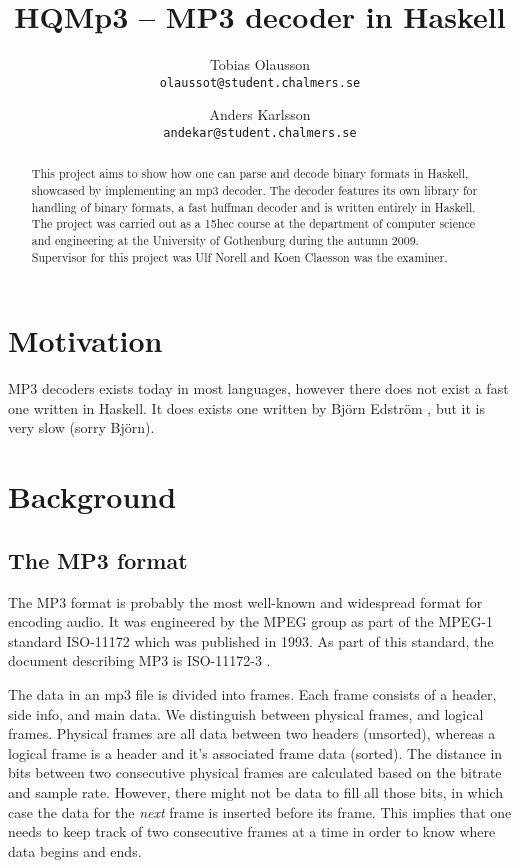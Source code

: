 \documentclass[a4paper,12pt]{article}
\title{HQMp3 -- MP3 decoder in Haskell}
\author{Tobias Olausson \\ \texttt{\small{olaussot@student.chalmers.se}} \and
        Anders Karlsson \\ \texttt{\small{andekar@student.chalmers.se}}
}
\date{ \rule{0.8 \linewidth}{0.5mm} \\[3mm]
       University of Gothenburg \\
       \small{\today}
}
\begin{document}
\maketitle

\begin{abstract}
    This project aims to show how one can parse and decode binary formats in
    Haskell, showcased by implementing an mp3 decoder. The decoder features its
    own library for handling of binary formats, a fast huffman decoder and is
    written entirely in Haskell. The project was carried out as a 15hec course
    at the department of computer science and engineering at the University of
    Gothenburg during the autumn 2009. \\

    Supervisor for this project was Ulf Norell and Koen Claesson was the
    examiner.
\end{abstract}

\newpage
\tableofcontents
\newpage

\section{Motivation}
    MP3 decoders exists today in most languages, however there does not exist
    a fast one written in Haskell. It does exists one written by Björn Edström
    \cite{bjorn}, but it is very slow (sorry
    Björn).

\section{Background}
    \subsection{The MP3 format}
       The MP3 format is probably the most well-known and widespread format for
       encoding audio. It was engineered by the MPEG group as part of the MPEG-1
       standard ISO-11172 which was published in 1993. As part of this standard,
       the document describing MP3 is ISO-11172-3 \cite{wikimp3,wikimpeg1}.

       The data in an mp3 file is divided into frames. Each frame consists of
       a header, side info, and main data. We distinguish between physical
       frames, and logical frames. Physical frames are all data between two
       headers (unsorted), whereas a logical frame is a header and it's
       associated frame data (sorted). The distance in bits between two
       consecutive physical frames are calculated based on the bitrate and sample
       rate. However, there might not be data to fill all those bits, in which
       case the data for the \textit{next} frame is inserted before its frame.
       This implies that one needs to keep track of two consecutive frames at a
       time in order to know where data begins and ends.
\end{document}
